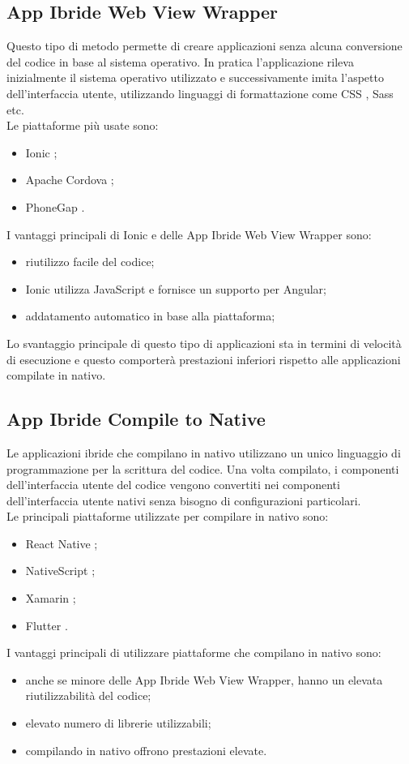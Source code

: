 \newpage

\subsection{App Ibride Web View Wrapper}
Questo tipo di metodo \cite{differenza,apptonative} permette di creare applicazioni senza alcuna conversione del codice in base al sistema operativo.
 In pratica l'applicazione rileva inizialmente il sistema operativo utilizzato e successivamente imita l'aspetto dell'interfaccia utente, utilizzando linguaggi di formattazione come CSS \cite{css}, Sass \cite{sass} etc. \\
Le piattaforme più usate sono:
\begin{itemize}
\item Ionic \cite{ionic}; 
\item Apache Cordova \cite{apache}; 
\item PhoneGap \cite{phonegap}.
\end{itemize}
I vantaggi principali di Ionic e delle App Ibride Web View Wrapper sono:
\begin{itemize}
	\item riutilizzo facile del codice; 
	\item Ionic utilizza JavaScript e fornisce un supporto per Angular;
	\item addatamento automatico in base alla piattaforma; 
\end{itemize}
Lo svantaggio principale di questo tipo di applicazioni sta in termini di velocità di esecuzione e questo comporterà prestazioni inferiori rispetto alle applicazioni compilate in nativo.\\

\subsection{App Ibride Compile to Native}
Le applicazioni ibride che compilano in nativo \cite{apptonative} utilizzano un unico linguaggio di programmazione per la scrittura del codice.
 Una volta compilato, i componenti dell'interfaccia utente del codice vengono convertiti nei componenti dell'interfaccia utente nativi senza bisogno di configurazioni particolari.\\
Le principali piattaforme utilizzate per compilare in nativo sono:
\begin{itemize}
	\item React Native \cite{reactnative}; 
	\item NativeScript \cite{nativescript}; 
	\item Xamarin \cite{xamarin}; 
	\item Flutter \cite{flutter}.
\end{itemize}
I vantaggi principali di utilizzare piattaforme che compilano in nativo sono:
\begin{itemize}
	\item anche se minore delle App Ibride Web View Wrapper, hanno un elevata riutilizzabilità del codice; 
	\item elevato numero di librerie utilizzabili;  
	\item compilando in nativo offrono prestazioni elevate.
\end{itemize}
\newpage

